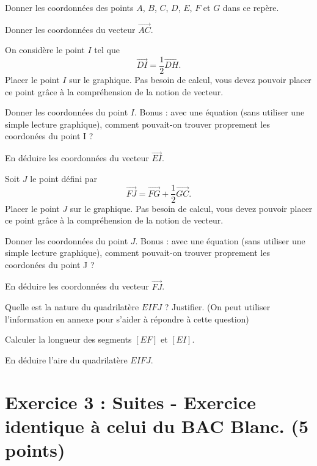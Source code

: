 \documentclass{exam}
\begin{document}
\begin{questions}
    \question[2] Donner les coordonnées des points $A$, $B$, $C$, $D$, $E$, $F$ et $G$ dans ce repère.

    \question[0.5] Donner les coordonnées du vecteur $\overrightarrow{AC}$.

    \question[0.5] On considère le point $I$ tel que 
    \[
    \overrightarrow{DI} = \frac{1}{2} \overrightarrow{DH}.
    \]
    Placer le point $I$ sur le graphique. Pas besoin de calcul, vous devez pouvoir placer ce point grâce à la compréhension de la notion de vecteur.

    \question[0.5] Donner les coordonnées du point $I$. Bonus : avec une équation (sans utiliser une simple lecture graphique), comment pouvait-on trouver proprement les coordonées du point I ? 

    \question[0.5] En déduire les coordonnées du vecteur $\overrightarrow{EI}$.

    \question[0.5] Soit $J$ le point défini par 
    \[
    \overrightarrow{FJ} = \overrightarrow{FG} + \frac{1}{2} \overrightarrow{GC}.
    \]
    Placer le point $J$ sur le graphique. Pas besoin de calcul, vous devez pouvoir placer ce point grâce à la compréhension de la notion de vecteur.

    \question[0.5] Donner les coordonnées du point $J$. Bonus : avec une équation (sans utiliser une simple lecture graphique), comment pouvait-on trouver proprement les coordonées du point J ? 

    \question[0.5] En déduire les coordonnées du vecteur $\overrightarrow{FJ}$.

    \question[1] Quelle est la nature du quadrilatère $EIFJ$ ? Justifier. (On peut utiliser l'information en annexe pour s'aider à répondre à cette question)

    \question[1] Calculer la longueur des segments $[EF]$ et $[EI]$.

    \question[0.5] En déduire l'aire du quadrilatère $EIFJ$.
\end{questions}


\section*{Exercice 3 : Suites - Exercice identique à celui du BAC Blanc. (5 points)}
\end{document}
